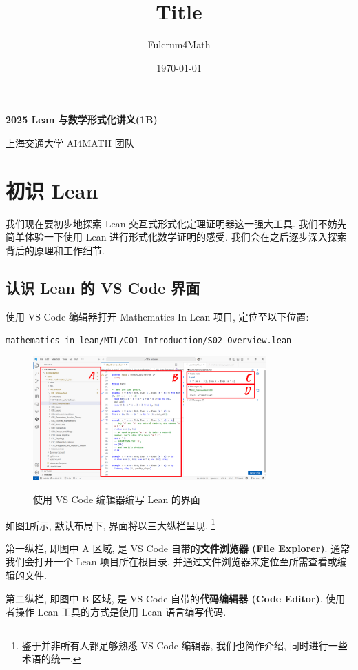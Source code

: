 \documentclass[UTF8]{ctexart}
\title{Title}
\author{Fulcrum4Math}
\date{\today}
\DeclareMathOperator{\0}{\mathbf{0}}                    %
\newcommand{\<}{\langle}
\renewcommand{\>}{\rangle}                              %
\theoremstyle{MyStyle} %
\begin{document}
    \begin{center}
        {\LARGE\textbf{2025 Lean 与数学形式化讲义(1B)}}

        上海交通大学 AI4MATH 团队
    \end{center}

    \section{初识 Lean}

        我们现在要初步地探索 Lean 交互式形式化定理证明器这一强大工具. 我们不妨先简单体验一下使用 Lean 进行形式化数学证明的感受. 我们会在之后逐步深入探索背后的原理和工作细节. 

    \subsection{认识 Lean 的 VS Code 界面}

        使用 VS Code 编辑器打开 Mathematics In Lean 项目, 定位至以下位置: 

        \texttt{mathematics\_in\_lean/MIL/C01\_Introduction/S02\_Overview.lean}

        \begin{figure}[htbp]
            \centering
            \includegraphics[width=0.8\textwidth]{figures/png/1.png}\label{fig:example1}
            \caption{使用 VS Code 编辑器编写 Lean 的界面}
        \end{figure}
    
        如图\ref{fig:example1}所示, 默认布局下, 界面将以三大纵栏呈现. \footnote{鉴于并非所有人都足够熟悉 VS Code 编辑器, 我们也简作介绍, 同时进行一些术语的统一. }
        
        第一纵栏, 即图中 A 区域, 是 VS Code 自带的\textbf{文件浏览器 (File Explorer)}. 通常我们会打开一个 Lean 项目所在根目录, 并通过文件浏览器来定位至所需查看或编辑的文件. 
        
        第二纵栏, 即图中 B 区域, 是 VS Code 自带的\textbf{代码编辑器 (Code Editor)}. 使用者操作 Lean 工具的方式是使用 Lean 语言编写代码. 
\end{document}
